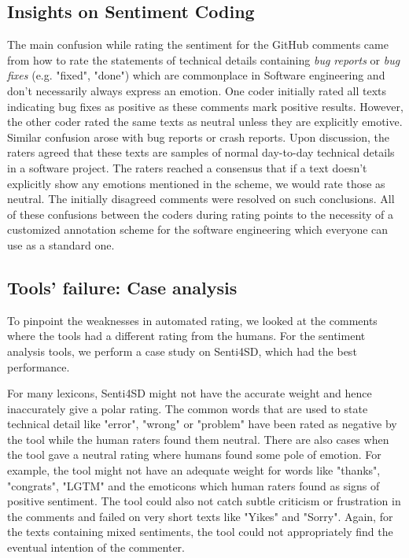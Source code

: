 \subsection{Insights on Sentiment Coding}\label{sentschemedis}
The main confusion while rating the sentiment for the GitHub comments came from how to rate the statements of technical details containing \textit{bug reports} or \textit{bug fixes} (e.g. "fixed", "done") which are commonplace in Software engineering and don't necessarily always express an emotion. One coder initially rated all texts indicating bug fixes as positive as these comments mark positive results. However, the other coder rated the same texts as neutral unless they are explicitly emotive. Similar confusion arose with bug reports or crash reports. Upon discussion, the raters agreed that these texts are samples of normal day-to-day technical details in a software project. The raters reached a consensus that if a text doesn't explicitly show any emotions mentioned in the scheme, we would rate those as neutral. The initially disagreed comments were resolved on such conclusions. All of these confusions between the coders during rating points to the necessity of a customized annotation scheme for the software engineering which everyone can use as a standard one. 

\subsection{Tools' failure: Case analysis}
To pinpoint the weaknesses in automated rating, we looked at the comments where the tools had a different rating from the humans.  For the sentiment analysis tools, we perform a case study on Senti4SD, which had the best performance. 

For many lexicons, Senti4SD might not have the accurate weight and hence inaccurately give a polar rating. The common words that are used to state technical detail like "error", "wrong" or "problem" have been rated as negative by the tool while the human raters found them neutral. There are also cases when the tool gave a neutral rating where humans found some pole of emotion. For example, the tool might not have an adequate weight for words like "thanks", "congrats", "LGTM" and the emoticons which human raters found as signs of positive sentiment. The tool could also not catch subtle criticism or frustration in the comments and failed on very short texts like "Yikes" and "Sorry". Again, for the texts containing mixed sentiments, the tool could not appropriately find the eventual intention of the commenter. 


